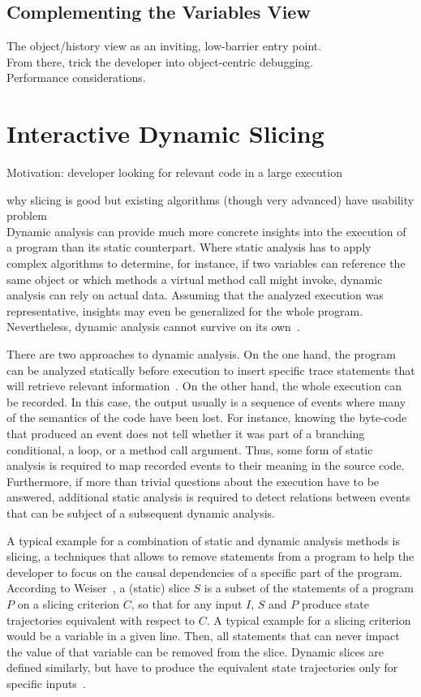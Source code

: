 \documentclass[english]{scrartcl}
\begin{document}
\subsection{Complementing the Variables View}
The object/history view as an inviting, low-barrier entry point.\\
From there, trick the developer into object-centric debugging.\\
Performance considerations.

\section{Interactive Dynamic Slicing}
Motivation: developer looking for relevant code in a large execution

why slicing is good but existing algorithms (though very advanced) have usability problem\\


Dynamic analysis can provide much more concrete insights into the execution of a program than its static counterpart.
Where static analysis has to apply complex algorithms to determine, for instance, if two variables can reference the same object or which methods a virtual method call might invoke, dynamic analysis can rely on actual data.
Assuming that the analyzed execution was representative, insights may even be generalized for the whole program.
Nevertheless, dynamic analysis cannot survive on its own~\cite{binkley_theoretical_2006}.

There are two approaches to dynamic analysis.
On the one hand, the program can be analyzed statically before execution to insert specific trace statements that will retrieve relevant information~\cite{ko_debugging_2008}.
On the other hand, the whole execution can be recorded.
In this case, the output usually is a sequence of events where many of the semantics of the code have been lost.
For instance, knowing the byte-code that produced an event does not tell whether it was part of a branching conditional, a loop, or a method call argument.
Thus, some form of static analysis is required to map recorded events to their meaning in the source code.
Furthermore, if more than trivial questions about the execution have to be answered, additional static analysis is required to detect relations between events that can be subject of a subsequent dynamic analysis.

A typical example for a combination of static and dynamic analysis methods is slicing, a techniques that allows to remove statements from a program to help the developer to focus on the causal dependencies of a specific part of the program.
According to Weiser~\cite{weiser_programmers_1982}, a (static) slice $S$ is a subset of the statements of a program $P$ on a slicing criterion $C$, so that for any input $I$, $S$ and $P$ produce state trajectories equivalent with respect to $C$.
A typical example for a slicing criterion would be a variable in a given line.
Then, all statements that can never impact the value of that variable can be removed from the slice.
Dynamic slices are defined similarly, but have to produce the equivalent state trajectories only for specific inputs~\cite{korel_dynamic_1990}.
\end{document}
